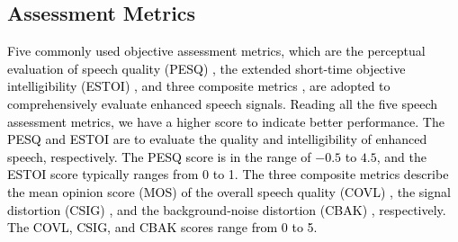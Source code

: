 \documentclass[journal]{IEEEtran}
\begin{document}
\subsection{Assessment Metrics}
\textcolor{black}{Five commonly used objective assessment metrics, which are the perceptual evaluation of speech quality (PESQ) \cite{PESQ}, the extended short-time objective intelligibility (ESTOI) \cite{estoi}, and three composite metrics \cite{composite}, are adopted to comprehensively evaluate enhanced speech signals. Reading all the five speech assessment metrics, we have a higher score to indicate better performance. The PESQ and ESTOI are to evaluate the quality and intelligibility of enhanced speech, respectively. The PESQ score is in the range of $-0.5$ to $4.5$, and the ESTOI score typically ranges from 0 to 1. The three composite metrics describe the mean opinion score (MOS) of the overall speech quality (COVL) \cite{composite}, the signal distortion (CSIG) \cite{composite}, and the background-noise distortion (CBAK) \cite{composite}, respectively. The COVL, CSIG, and CBAK scores range from 0 to 5.}



\end{document}

